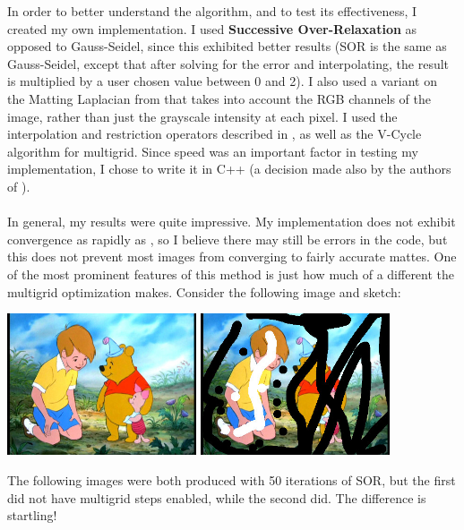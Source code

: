 In order to better understand the algorithm, and to test its effectiveness, I created my own implementation. I used \textbf{Successive Over-Relaxation} as opposed to Gauss-Seidel, since this exhibited better results (SOR is the same as Gauss-Seidel, except that after solving for the error and interpolating, the result is multiplied by a user chosen value between 0 and 2). I also used a variant on the Matting Laplacian from \cite{levin08} that takes into account the RGB channels of the image, rather than just the grayscale intensity at each pixel. I used the interpolation and restriction operators described in \cite{lee14}, as well as the V-Cycle algorithm for multigrid. Since speed was an important factor in testing my implementation, I chose to write it in C++ (a decision made also by the authors of \cite{lee14}).
\\\\
In general, my results were quite impressive. My implementation does not exhibit convergence as rapidly as \cite{lee14}, so I believe there may still be errors in the code, but this does not prevent most images from converging to fairly accurate mattes. One of the most prominent features of this method is just how much of a different the multigrid optimization makes. Consider the following image and sketch:
\\
\begin{center}
\includegraphics[width=2.2in]{fig/pooh_med.jpg}
\hspace{.2in}
\includegraphics[width=2.2in]{fig/christopher_med_sketch.jpg}
\end{center}
The following images were both produced with 50 iterations of SOR, but the first did not have multigrid steps enabled, while the second did. The difference is startling!
